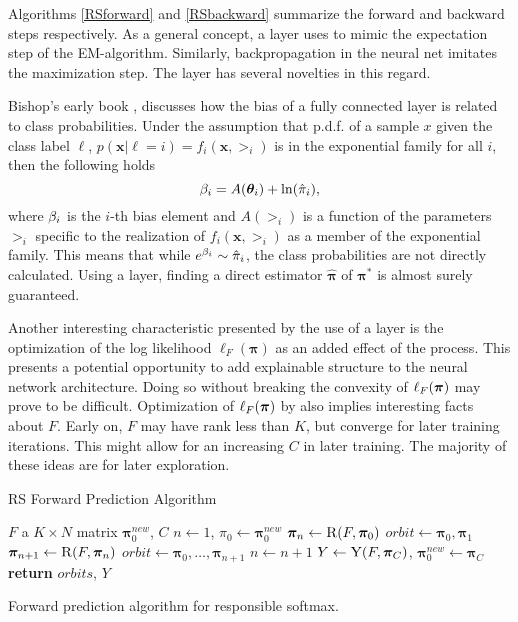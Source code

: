 Algorithms \ref{RSforward} and \ref{RSbackward} summarize the forward and backward steps respectively.  As a general concept, a \RS layer uses \DR to mimic the expectation step of the EM-algorithm. Similarly, backpropagation in the neural net imitates the maximization step.  The \RS layer has several novelties in this regard.  

Bishop's early book \cite[ch.6, equation 6.159]{Bishop1995}, discusses how the bias of a fully connected layer is related to class probabilities. Under the assumption that p.d.f. of a sample \( x \) given the class label \( \ell \), \( p(\bm x| \ell = i) = f_i(\bm x,\bm\gt_i) \) is in the exponential family for all \( i \), then the following holds
\begin{equation}
\beta_i = A(\bm{\theta}_i)+\ln(\hat{\pi}_i),
\end{equation}
where \( \beta_i \) is the \( i \)-th bias element and \( A(\bm\gt_i) \) is a function of the parameters \( \bm\gt_i \) specific to the realization of \( f_i(\bm x,\bm\gt_i) \) as a member of the exponential family. This means that while \( e^{\beta_i}\sim \hat{\pi}_i \), the class probabilities are not directly calculated. Using a \RS layer, finding a direct estimator \( \hat{\bm \pi} \) of \( \bm\pi^{\ast} \) is almost surely guaranteed.

Another interesting characteristic presented by the use of a \RS layer is the optimization of the log likelihood \( \ell_F(\bm\pi) \) as an added effect of the process. This presents a potential opportunity to add explainable structure to the neural network architecture. Doing so without breaking the convexity of \( \ell_{F}({\bm\pi}) \) may prove to be difficult. Optimization of \( \ell_{F}({\bm\pi}) \) by \RS also implies interesting facts about $F$. Early on, $F$ may have rank less than $K$, but converge for later training iterations.  This might allow for an increasing \( C \) in later training. The majority of these ideas are for later exploration.

\begin{table}
	
	\begin{algorithm}[H]
		\caption{RS Forward Prediction Algorithm}\label{RSforward}
		\begin{algorithmic}
			\Require $F$ a $K\times N$ matrix
			\Require $\bm\pi_0^{new}$, $C$
			\State $n \gets 1$, \( \pi_0 \gets  \bm\pi_0^{new}\)
			\State $\bm\pi_n \gets \Call{R}{F,\bm\pi_0}$
			\State $orbit \gets {\bm\pi_0,\bm\pi_1}$
			\State $\bm\pi_{n+1} \gets \Call{R}{F,\bm\pi_n}$
			\State $orbit \gets {\bm\pi_0,\ldots,\bm\pi_{n+1}}$
			\State $n\gets n+1$
			\EndWhile
			\State \( Y\gets \Call{Y}{F,\bm\pi_C} \), $\bm\pi_0^{new} \gets \bm\pi_C$
			\State \textbf{return} $orbits$, $Y$ 
			\EndProcedure
		\end{algorithmic}
	\end{algorithm}
	\caption{Forward prediction algorithm for responsible softmax.}
\end{table}

